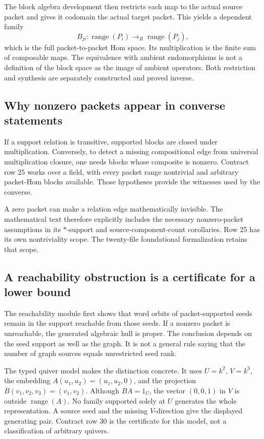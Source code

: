 \documentclass[11pt,a4paper]{article}
\begin{document}
The block algebra development then restricts each map to the actual source packet and gives it codomain the actual target packet. This yields a dependent family
\[
B_{ji}:\operatorname{range}(P_i)\longrightarrow_R\operatorname{range}(P_j),
\]
which is the full packet-to-packet Hom space. Its multiplication is the finite sum of composable maps. The equivalence with ambient endomorphisms is not a definition of the block space as the image of ambient operators. Both restriction and synthesis are separately constructed and proved inverse.

\subsection{Why nonzero packets appear in converse statements}

If a support relation is transitive, supported blocks are closed under multiplication. Conversely, to detect a missing compositional edge from universal multiplication closure, one needs blocks whose composite is nonzero. Contract row 25 works over a field, with every packet range nontrivial and arbitrary packet-Hom blocks available. Those hypotheses provide the witnesses used by the converse.

A zero packet can make a relation edge mathematically invisible. The mathematical text therefore explicitly includes the necessary nonzero-packet assumptions in its $*$-support and source-component-count corollaries. Row 25 has its own nontriviality scope. The twenty-file foundational formalization retains that scope.

\subsection{A reachability obstruction is a certificate for a lower bound}

The reachability module first shows that word orbits of packet-supported seeds remain in the support reachable from those seeds. If a nonzero packet is unreachable, the generated algebraic hull is proper. The conclusion depends on the seed support as well as the graph. It is not a general rule saying that the number of graph sources equals unrestricted seed rank.

The typed quiver model makes the distinction concrete. It uses $U=k^2$, $V=k^3$, the embedding
$A(u_1,u_2)=(u_1,u_2,0)$, and the projection $B(v_1,v_2,v_3)=(v_1,v_2)$. Although $BA=1_U$, the vector $(0,0,1)$ in $V$ is outside $\operatorname{range}(A)$. No family supported solely at $U$ generates the whole representation. A source seed and the missing $V$-direction give the displayed generating pair. Contract row 30 is the certificate for this model, not a classification of arbitrary quivers.
\end{document}
